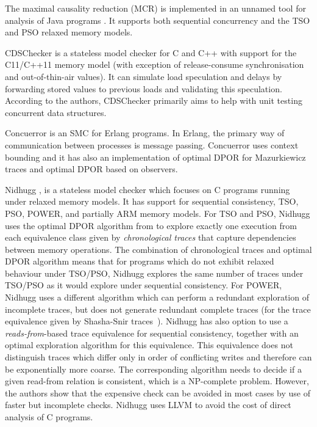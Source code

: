 The maximal causality reduction (MCR) is implemented in an unnamed tool for analysis of Java programs .
It supports both sequential concurrency and the TSO and PSO relaxed memory models.

CDSChecker  is a stateless model checker for C and C++ with support for the C11/C++11 memory model (with exception of release-consume synchronisation and out-of-thin-air values).
It can simulate load speculation and delays by forwarding stored values to previous loads and validating this speculation.
According to the authors, CDSChecker primarily aims to help with unit testing concurrent data structures.

Concuerror  is an SMC for Erlang programs.
In Erlang, the primary way of communication between processes is message passing.
Concuerror uses context bounding and it has also an implementation of optimal DPOR for Mazurkiewicz traces and optimal DPOR based on observers.

Nidhugg , is a stateless model
checker which focuses on C programs running under relaxed memory models. It
has support for sequential consistency, TSO, PSO, POWER, and partially ARM
memory models.
For TSO and PSO, Nidhugg uses the optimal DPOR algorithm from  to explore exactly one execution from each equivalence class given by \emph{chronological traces} that capture dependencies between memory operations.
The combination of chronological traces and optimal DPOR algorithm means that
for programs which do not exhibit relaxed behaviour under TSO/PSO, Nidhugg
explores the same number of traces under TSO/PSO as it would explore under
sequential consistency.
For POWER, Nidhugg uses a different algorithm which can perform a redundant exploration of incomplete traces, but does not generate redundant complete traces (for the trace equivalence given by Shasha-Snir traces~).
Nidhugg has also option to use a \emph{reads-from}-based trace equivalence for sequential consistency, together with an optimal exploration algorithm for this equivalence.
This equivalence does not distinguish traces which differ only in order of conflicting writes and therefore can be exponentially more coarse.
The corresponding algorithm needs to decide if a given read-from relation is consistent, which is a NP-complete problem.
However, the authors show that the expensive check can be avoided in most cases by use of faster but incomplete checks.
Nidhugg uses LLVM to avoid the cost of direct analysis of C programs.

